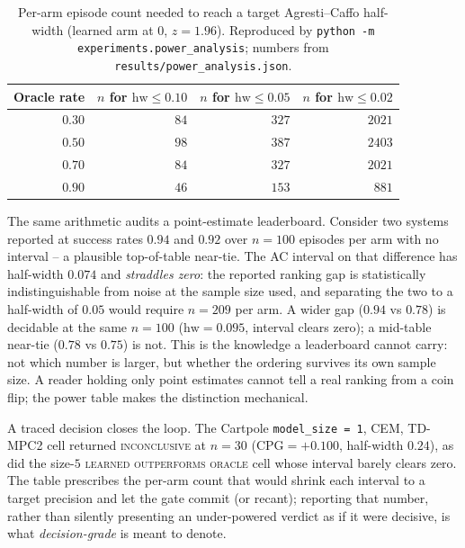 \documentclass[10pt,letterpaper]{article}
\begin{document}
\begin{table}[t]
  \centering
  \small
  \begin{tabular}{rrrr}
    \toprule
    Oracle rate & $n$ for $\mathrm{hw}\!\le\!0.10$ & $n$ for $\mathrm{hw}\!\le\!0.05$ & $n$ for $\mathrm{hw}\!\le\!0.02$ \\
    \midrule
    $0.30$ & $84$  & $327$ & $2021$ \\
    $0.50$ & $98$  & $387$ & $2403$ \\
    $0.70$ & $84$  & $327$ & $2021$ \\
    $0.90$ & $46$  & $153$ & $881$  \\
    \bottomrule
  \end{tabular}
  \caption{Per-arm episode count needed to reach a target Agresti--Caffo half-width (learned arm at $0$, $z = 1.96$). Reproduced by \texttt{python -m experiments.power\_analysis}; numbers from \texttt{results/power\_analysis.json}.}
  \label{tab:power}
\end{table}

The same arithmetic audits a point-estimate leaderboard. Consider two systems reported at success rates $0.94$ and $0.92$ over $n = 100$ episodes per arm with no interval -- a plausible top-of-table near-tie. The AC interval on that difference has half-width $0.074$ and \emph{straddles zero}: the reported ranking gap is statistically indistinguishable from noise at the sample size used, and separating the two to a half-width of $0.05$ would require $n = 209$ per arm. A wider gap ($0.94$ vs $0.78$) is decidable at the same $n = 100$ ($\mathrm{hw} = 0.095$, interval clears zero); a mid-table near-tie ($0.78$ vs $0.75$) is not. This is the knowledge a leaderboard cannot carry: not which number is larger, but whether the ordering survives its own sample size. A reader holding only point estimates cannot tell a real ranking from a coin flip; the power table makes the distinction mechanical.

A traced decision closes the loop. The Cartpole \texttt{model\_size = 1}, CEM, TD-MPC2 cell returned \textsc{inconclusive} at $n = 30$ ($\mathrm{CPG} = +0.100$, half-width $0.24$), as did the size-$5$ \textsc{learned outperforms oracle} cell whose interval barely clears zero. The table prescribes the per-arm count that would shrink each interval to a target precision and let the gate commit (or recant); reporting that number, rather than silently presenting an under-powered verdict as if it were decisive, is what \emph{decision-grade} is meant to denote.
\end{document}
